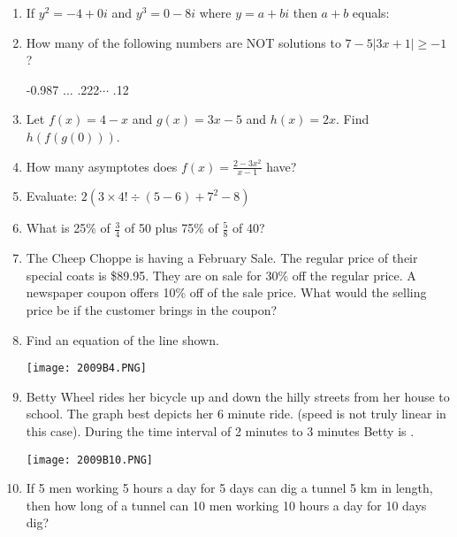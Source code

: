 \documentclass[../uilmath.tex]{subfiles}
\begin{document}
\begin{enumerate}[label=\bfseries\arabic*.]
        \item %
        If $y^2=-4+0i$ and $y^3=0-8i$ where $y=a+bi$ then $a+b$ equals:

        \item %
        How many of the following numbers are NOT solutions to $7-5|3x+1|\geq -1$?
        \begin{center}
            -0.987 $\dots$ \qquad .222$\cdots$  \qquad .12
        \end{center}

        \item %
        Let $f(x)=4-x$ and $g(x)=3x-5$ and $h(x)=2x$. Find $h(f(g(0)))$.

        \item %
        How many asymptotes does $f(x)=\frac{2-3x^2}{x-1}$ have?

        \item %
        Evaluate: $2(3\times 4!\div (5-6)+7^2-8)$

        \item %
        What is 25\% of $\frac{3}{4}$ of 50 plus 75\% of $\frac{5}{8}$ of 40?

        \item %
        The Cheep Choppe is having a February Sale. The regular price of their special coats is \$89.95.
        They are on sale for 30\% off the regular price. A newspaper coupon offers 10\% off of the sale price. What would the selling price be if the customer brings in the coupon?

        \item %
        Find an equation of the line shown.
        \begin{center}
            \texttt{[image: 2009B4.PNG]}
        \end{center}

        \item %
        Betty Wheel rides her bicycle up and down the hilly streets from her house to school. The graph best depicts her 6 minute ride. (speed is not truly linear in this case).
        During the time interval of 2 minutes to 3 minutes Betty is \blank .
        \begin{center}
            \texttt{[image: 2009B10.PNG]}
        \end{center}

        \item %
        If 5 men working 5 hours a day for 5 days can dig a tunnel 5 km in length, then how long of a tunnel can 
        10 men working 10 hours a day for 10 days dig?


\end{enumerate}
\end{document}
